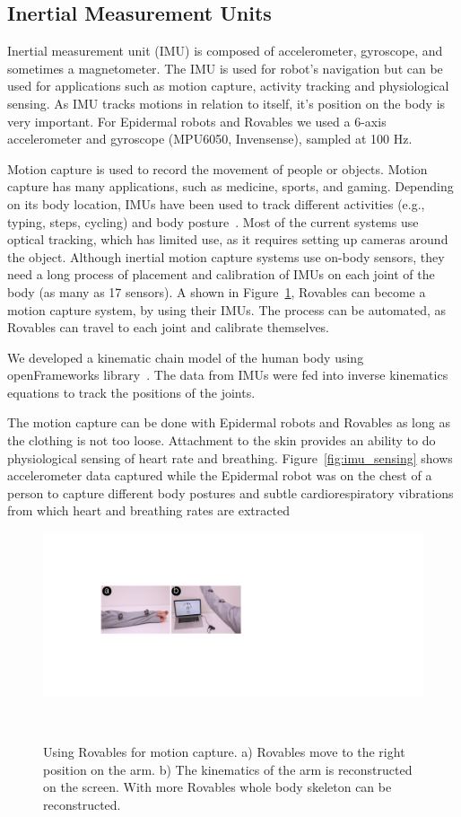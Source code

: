 \subsection{Inertial Measurement Units}
Inertial measurement unit (IMU) is composed of accelerometer, gyroscope, and sometimes a magnetometer. The IMU is used for robot's navigation but can be used for applications such as motion capture, activity tracking and physiological sensing. As IMU tracks motions in relation to itself, it's position on the body is very important. For Epidermal robots and Rovables we used a 6-axis accelerometer and gyroscope (MPU6050, Invensense), sampled at 100 Hz.

Motion capture is used to record the movement of people or objects. Motion capture has many applications, such as medicine, sports, and gaming. Depending on its body location, IMUs have been used to track different activities (e.g., typing, steps, cycling) and body posture~\cite{attal2015physical}.  Most of the current systems use optical tracking, which has limited use, as it requires setting up cameras around the object. Although inertial motion capture systems use on-body sensors, they need a long process of placement and calibration of IMUs on each joint of the body (as many as 17 sensors). A shown in Figure~\ref{fig:skeleton}, Rovables can become a motion capture system, by using their IMUs. The process can be automated, as Rovables can travel to each joint and calibrate themselves. 

We developed a kinematic chain model of the human body using openFrameworks library~\cite{ofxSkeleton}. The data from IMUs were fed into inverse kinematics equations to track the positions of the joints.

The motion capture can be done with Epidermal robots and  Rovables as long as the clothing is not too loose. Attachment to the skin provides an ability to do physiological sensing of heart rate and breathing. 
Figure~\ref{fig:imu_sensing} shows accelerometer data captured while the Epidermal robot was on the chest of a person to capture different body postures and subtle cardiorespiratory vibrations from which heart and breathing rates are extracted~\cite{hernandez2015biophone}
 

 
 \begin{figure}[h]
\centering
  \includegraphics[width=1\columnwidth]{pictures/chapter4/skeleton.pdf}
  \caption{Using Rovables for motion capture. a) Rovables move to the right position on the arm. b) The kinematics of the arm is reconstructed on the screen. With more Rovables whole body skeleton can be reconstructed.}~\label{fig:skeleton}
\end{figure}


